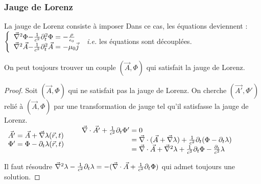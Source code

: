 \subsubsection{Jauge de Lorenz}
	La jauge de Lorenz consiste à imposer 
	Dans ce cas, les équations deviennent :
	\indent
	$
		\left\{ \begin{array}{c@{-}c@{\;}l}
			\nab^2\Phi&\frac{1}{c^2}\partial_t^2\Phi&=-\frac{\rho}{\epsilon_0}\\
			\nab^2\vec{A}&\frac{1}{c^2}\partial_t^2\vec{A}&=-\mu_0\vec{j}
		\end{array} \right.
	$
	\emph{i.e.} les équations sont découplées.

	\begin{theorem}
		On peut toujours trouver un couple $(\vec{A},\Phi)$ qui satisfait la jauge de Lorenz.
	\end{theorem}
	
	\begin{proof}
		Soit $(\vec{A},\Phi)$ qui ne satisfait pas la jauge de Lorenz. On cherche $(\vec{A'},\Phi')$ relié à $(\vec{A},\Phi)$ par une transformation de jauge tel qu'il satisfasse la jauge de Lorenz.\\
\indent
	$ 
		\begin{array}{r@{\;}l}
				\vec{A'} &=\vec{A}+\nab\lambda(\vec{r},t)\\
			\Phi'&=\Phi-\partial_t\lambda(\vec{r},t)
		\end{array}\\[10pt]\indent
		\begin{array}{r@{\;}l}
			\nab\cdot\vec{A'}+\frac{1}{c^2}\partial_t\Phi'&=0\\
			&=\nab\cdot(\vec{A}+\nab\lambda)+\frac{1}{c^2}\partial_t(\Phi-\partial_t\lambda)\\
			&=\nab\cdot\vec{A}+\nab^2\lambda+\frac{1}{c^2}\partial_t\Phi-\frac{\partial_t}{c^2}\lambda
		\end{array}
	$	
	\medskip
	
	Il faut résoudre $\vec{\nabla}^2\lambda-\frac{1}{c^2}\partial_t\lambda=-(\vec{\nabla}\cdot\vec{A}+\frac{1}{c^2}\partial_t\Phi)$ qui admet toujours une solution. \qedhere
	\end{proof}
	
